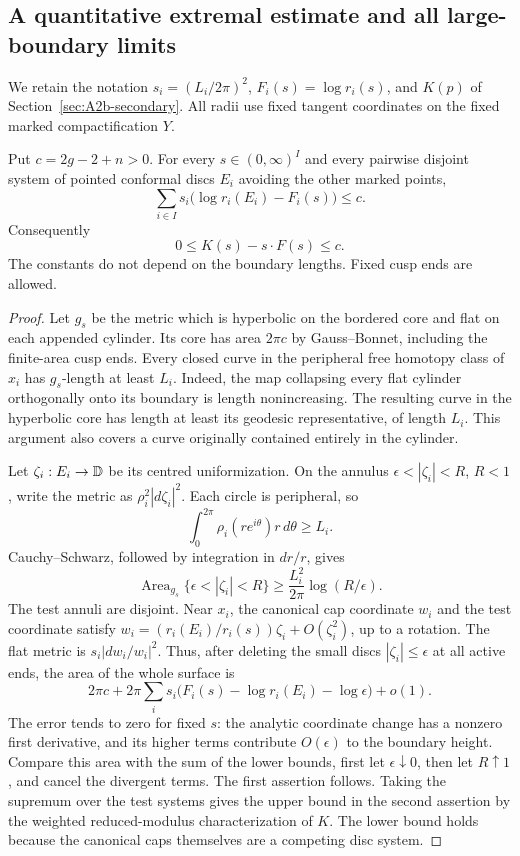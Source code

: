 \subsection{A quantitative extremal estimate and all large-boundary limits}

We retain the notation $s_i=(L_i/2\pi)^2$, $F_i(s)=\log r_i(s)$,
and $K(p)$ of Section~\ref{sec:A2b-secondary}. All radii use fixed tangent
coordinates on the fixed marked compactification $Y$.

\begin{lemma}\label{A2-strebel-deficit}
Put $c=2g-2+n>0$. For every $s\in(0,\infty)^I$ and every pairwise
disjoint system of pointed conformal discs $E_i$ avoiding the other
marked points,
\[
 \sum_{i\in I}s_i\bigl(\log r_i(E_i)-F_i(s)\bigr)\leq c.
\]
Consequently
\[
 0\leq K(s)-s\cdot F(s)\leq c.
\]
The constants do not depend on the boundary lengths. Fixed cusp ends
are allowed.
\end{lemma}
\begin{proof}
Let $g_s$ be the metric which is hyperbolic on the bordered core and
flat on each appended cylinder. Its core has area $2\pi c$ by
Gauss--Bonnet, including the finite-area cusp ends. Every closed curve
in the peripheral free homotopy class of $x_i$ has $g_s$-length at least
$L_i$. Indeed, the map collapsing every flat cylinder orthogonally onto
its boundary is length nonincreasing. The resulting curve in the
hyperbolic core has length at least its geodesic representative, of
length $L_i$. This argument also covers a curve originally contained
entirely in the cylinder.

Let $\zeta_i:E_i\to{\ensuremath{\mathbb{D}}}$ be its centred uniformization. On the annulus
$\epsilon<|\zeta_i|<R$, $R<1$, write the metric as
$\rho_i^2|d\zeta_i|^2$. Each circle is peripheral, so
\[
 \int_0^{2\pi}\rho_i(re^{i\theta})r\,d\theta\geq L_i.
\]
Cauchy--Schwarz, followed by integration in $dr/r$, gives
\[
 \operatorname{Area}_{g_s}\{\epsilon<|\zeta_i|<R\}
 \geq\frac{L_i^2}{2\pi}\log(R/\epsilon).
\]
The test annuli are disjoint. Near $x_i$, the canonical cap coordinate
$w_i$ and the test coordinate satisfy
$w_i=(r_i(E_i)/r_i(s))\zeta_i+O(\zeta_i^2)$, up to a rotation.
The flat metric is $s_i|dw_i/w_i|^2$. Thus, after deleting the small
discs $|\zeta_i|\leq\epsilon$ at all active ends, the area of the whole
surface is
\[
 2\pi c+2\pi\sum_i s_i
 \bigl(F_i(s)-\log r_i(E_i)-\log\epsilon\bigr)+o(1).
\]
The error tends to zero for fixed $s$: the analytic coordinate change
has a nonzero first derivative, and its higher terms contribute
$O(\epsilon)$ to the boundary height. Compare this area with the sum
of the lower bounds, first let $\epsilon\downarrow0$, then let
$R\uparrow1$, and cancel the divergent terms. The first assertion
follows. Taking the supremum over the test systems gives the upper
bound in the second assertion by the weighted reduced-modulus
characterization of $K$. The lower bound holds because the canonical
caps themselves are a competing disc system.
\end{proof}

